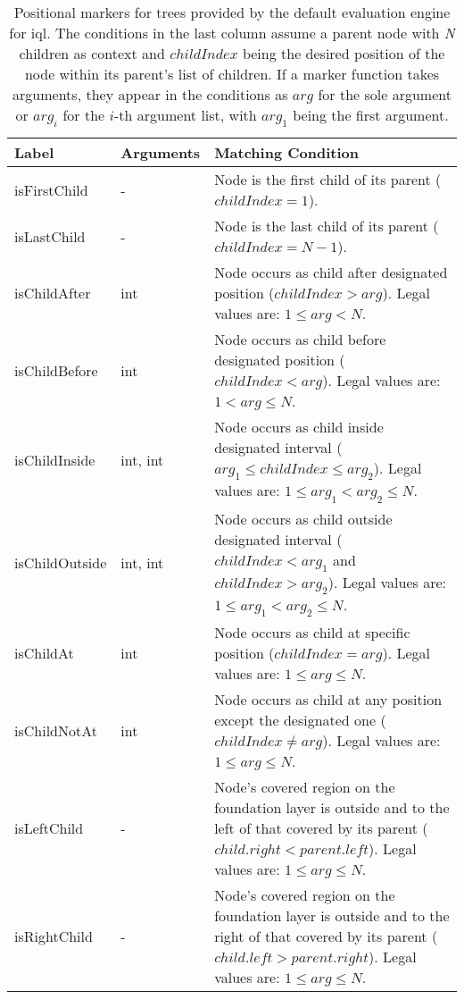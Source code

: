 \documentclass[11pt,a4paper]{report}
\begin{document}
\begin{table}[!htb]\centering
	\begin{tabular}{|p{}|p{}|p{}|}
		\hline 
		\textbf{Label} & \textbf{Arguments} & \textbf{Matching Condition} \\ 
		\hline 
		\hline  
		isFirstChild & - & Node is the first child of its parent ($childIndex = 1$). \\ 
		\hline 
		isLastChild & - & Node is the last child of its parent ($childIndex = N-1$). \\  
		\hline 
		isChildAfter & int & Node occurs as child after designated position ($childIndex > arg$). Legal values are: $1 \leq arg < N$. \\  
		\hline 
		isChildBefore & int & Node occurs as child before designated position ($childIndex < arg$). Legal values are: $1 < arg \leq N$. \\  
		\hline 
		isChildInside & int, int & Node occurs as child inside designated interval ($arg_1 \leq childIndex \leq arg_2$). Legal values are: $1 \leq arg_1 < arg_2 \leq N$. \\  
		\hline 
		isChildOutside & int, int & Node occurs as child outside designated interval ($childIndex < arg_1$ and $childIndex>arg_2$). Legal values are: $1 \leq arg_1 < arg_2 \leq N$. \\  
		\hline 
		isChildAt & int & Node occurs as child at specific position ($childIndex = arg$). Legal values are: $1 \leq arg \leq N$. \\  
		\hline 
		isChildNotAt & int & Node occurs as child at any position except the designated one ($childIndex \neq arg$). Legal values are: $1 \leq arg \leq N$. \\  
		\hline 
		isLeftChild & - & Node's covered region on the foundation layer is outside and to the left of that covered by its parent ($child.right < parent.left$). Legal values are: $1 \leq arg \leq N$. \\  
		\hline 
		isRightChild & - & Node's covered region on the foundation layer is outside and to the right of that covered by its parent ($child.left > parent.right$). Legal values are: $1 \leq arg \leq N$. \\  
		\hline 
	\end{tabular}
	\caption[Tree positional markers]{Positional markers for trees provided by the default evaluation engine for \ac{iql}. The conditions in the last column assume a parent node with \textit{N} children as context and $childIndex$ being the desired position of the node within its parent's list of children. If a marker function takes arguments, they appear in the conditions as $arg$ for the sole argument or $arg_i$ for the $i$-th argument list, with $arg_1$ being the first argument.}
	\label{tab:tree-position-markers}
\end{table}
\end{document}
